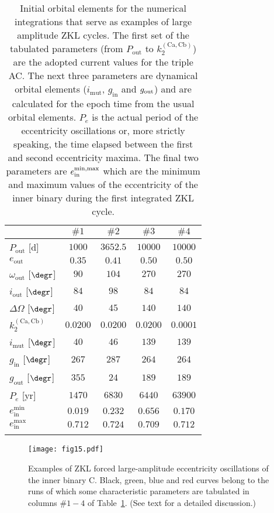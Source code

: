 \documentclass[fleqn,usenatbib]{mnras} %
\begin{document}
\begin{table}
\centering
\caption{Initial orbital elements for the numerical integrations that serve as examples of large amplitude ZKL cycles. The first set of the tabulated parameters (from $P_\mathrm{out}$ to $k_2^\mathrm{(Ca,Cb)}$) are the adopted current values for the triple AC. The next three parameters are dynamical orbital elements ($i_\mathrm{mut}$, $g_\mathrm{in}$ and $g_{\rm out}$) and are calculated for the epoch time from the usual orbital elements. $P_e$ is the actual period of the eccentricity oscillations or, more strictly speaking, the time elapsed between the first and second eccentricity maxima. The final two parameters are $e_\mathrm{in}^{\rm min,max}$ which are the minimum and maximum values of the eccentricity of the inner binary during the first integrated ZKL cycle.}
\begin{tabular}{lcccc}
\hline
&  $\#1$ & $\#2$ & $\#3$ & $\#4$ \\
\hline
$P_\mathrm{out}$ [d] & $1000$ & $3652.5$ & $10000$ & $10000$  \\
$e_\mathrm{out}$     & $0.35$ & $0.41$ & $0.50$  & $0.50$   \\
$\omega_\mathrm{out}$ [$\degr$] & $90$ & $104$ & $270$ & $270$ \\
$i_\mathrm{out}$ [$\degr$] & $84$ & $98$ & $84$ & $84$ \\
$\Delta\Omega$ [$\degr$] & $40$ & $45$ & $140$ & $140$ \\
$k_2^\mathrm{(Ca,Cb)}$ & $0.0200$ & $0.0200$ & $0.0200$ & $0.0001$ \\
\hline
$i_\mathrm{mut}$ [$\degr$] & $40$ & $46$ & $139$  & $139$  \\
$g_\mathrm{in}$ [$\degr$]& $267$ & $287$ & $264$  & $264$ \\
$g_\mathrm{out}$ [$\degr$]&$355$ & $24$ & $189$  & $189$ \\
$P_e$ [yr] & $1470$ & $6830$ & $6440$  & $63900$ \\
$e_\mathrm{in}^\mathrm{min}$ & $0.019$ & $0.232$ & $0.656$ & $0.170$ \\
$e_\mathrm{in}^\mathrm{max}$ & $0.712$ & $0.724$ & $0.709$ & $0.712$ \\
\hline
\label{tbl:numint}
\end{tabular}
\end{table}


\begin{figure}
\centering
\texttt{[image: fig15.pdf]}
\caption{Examples of ZKL forced large-amplitude eccentricity oscillations of the inner binary C.  Black, green, blue and red curves belong to the runs of which some characteristic parameters are tabulated in columns $\#1-4$ of Table~\ref{tbl:numint}. (See text for a detailed discussion.)}
\label{fig:ZKL_ecc}
\end{figure}
\end{document}

